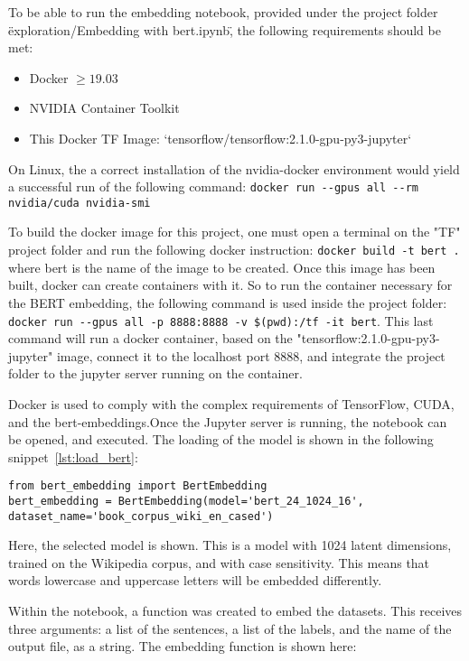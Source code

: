 To be able to run the embedding notebook, provided under the project folder \"exploration/Embedding with bert.ipynb\", the following requirements should be met:
\begin{itemize}
  \item Docker $\geq19.03$
  \item NVIDIA Container Toolkit
  \item This Docker TF Image: `tensorflow/tensorflow:2.1.0-gpu-py3-jupyter`
\end{itemize}

On Linux, the a correct installation of the nvidia-docker environment would yield a successful run of the following command: \lstinline{docker run --gpus all --rm nvidia/cuda nvidia-smi}

To build the docker image for this project, one must open a terminal on the "TF" project folder and run the following docker instruction: \lstinline{docker build -t bert .} where bert is the name of the image to be created.
Once this image has been built, docker can create containers with it. So to run the container necessary for the BERT embedding, the following command is used inside the project folder: \lstinline{docker run --gpus all -p 8888:8888 -v $(pwd):/tf -it bert}.
This last command will run a docker container, based on the "tensorflow:2.1.0-gpu-py3-jupyter" image, connect it to the localhost port 8888, and integrate the project folder to the jupyter server running on the container.


Docker is used to comply with the complex requirements of TensorFlow, CUDA, and the bert-embeddings.Once the Jupyter server is running, the notebook can be opened, and executed. The loading of the model is shown in the following snippet~\ref{lst:load_bert}:

\begin{lstlisting}[caption={Loading BERT},label=lst:load_bert,frame=single]
from bert_embedding import BertEmbedding
bert_embedding = BertEmbedding(model='bert_24_1024_16', dataset_name='book_corpus_wiki_en_cased')
\end{lstlisting}

Here, the selected model is shown. This is a model with 1024 latent dimensions, trained on the Wikipedia corpus, and with case sensitivity. This means that words lowercase and uppercase letters will be embedded differently.

Within the notebook, a function was created to embed the datasets. This receives three arguments: a list of the sentences, a list of the labels, and the name of the output file, as a string. The embedding function is shown here:

